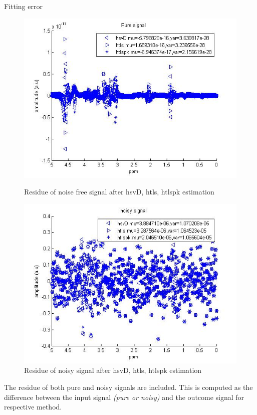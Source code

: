 \documentclass[t,12pt,english
\ifx\beamermode\undefined\else,\beamermode\fi
]{beamer}
\begin{document}
\begin{frame}{Fitting error}


\begin{figure}[!htbp]
%
\centering
\includegraphics[width=1\textwidth]{24.jpg}
\caption{\tiny Residue of noise free signal after hsvD, htls, htlspk estimation}
\endminipage\hfill
{}%
\centering
\includegraphics[width=1\textwidth]{25.jpg}
\caption{\tiny Residue of noisy signal after hsvD, htls, htlspk estimation}
\endminipage\hfill
\centering
\end{figure}

\tiny{The residue of both pure and noisy signals are included. This is computed as the difference between the input signal \textit{(pure or noisy)} and the outcome signal for respective method.}

\end{frame}
\end{document}
